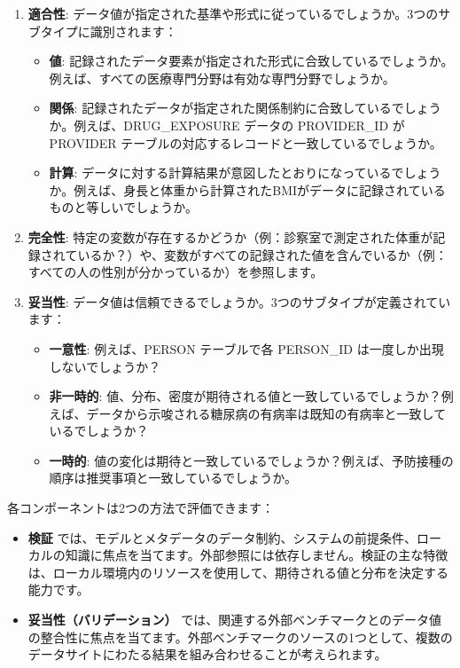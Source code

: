 \documentclass[
  11pt]{book}
\providecommand{\tightlist}{%
  \setlength{\itemsep}{0pt}\setlength{\parskip}{0pt}}
\theoremstyle{definition}
\theoremstyle{definition}
\theoremstyle{definition}
\theoremstyle{definition}
\theoremstyle{remark}
\begin{document}
\begin{enumerate}
\def\labelenumi{\arabic{enumi}.}
\item
  \textbf{適合性}: データ値が指定された基準や形式に従っているでしょうか。3つのサブタイプに識別されます：

  \begin{itemize}
  \tightlist
  \item
    \textbf{値}: 記録されたデータ要素が指定された形式に合致しているでしょうか。例えば、すべての医療専門分野は有効な専門分野でしょうか。
  \item
    \textbf{関係}: 記録されたデータが指定された関係制約に合致しているでしょうか。例えば、DRUG\_EXPOSURE データの PROVIDER\_ID が PROVIDER テーブルの対応するレコードと一致しているでしょうか。
  \item
    \textbf{計算}: データに対する計算結果が意図したとおりになっているでしょうか。例えば、身長と体重から計算されたBMIがデータに記録されているものと等しいでしょうか。
  \end{itemize}
\item
  \textbf{完全性}: 特定の変数が存在するかどうか（例：診察室で測定された体重が記録されているか？）や、変数がすべての記録された値を含んでいるか（例：すべての人の性別が分かっているか）を参照します。
\item
  \textbf{妥当性}: データ値は信頼できるでしょうか。3つのサブタイプが定義されています：

  \begin{itemize}
  \tightlist
  \item
    \textbf{一意性}: 例えば、PERSON テーブルで各 PERSON\_ID は一度しか出現しないでしょうか？
  \item
    \textbf{非一時的}: 値、分布、密度が期待される値と一致しているでしょうか？例えば、データから示唆される糖尿病の有病率は既知の有病率と一致しているでしょうか？
  \item
    \textbf{一時的}: 値の変化は期待と一致しているでしょうか？例えば、予防接種の順序は推奨事項と一致しているでしょうか。
  \end{itemize}

    
\end{enumerate}

各コンポーネントは2つの方法で評価できます：

\begin{itemize}
\tightlist
\item
  \textbf{検証} では、モデルとメタデータのデータ制約、システムの前提条件、ローカルの知識に焦点を当てます。外部参照には依存しません。検証の主な特徴は、ローカル環境内のリソースを使用して、期待される値と分布を決定する能力です。
\item
  \textbf{妥当性（バリデーション）} では、関連する外部ベンチマークとのデータ値の整合性に焦点を当てます。外部ベンチマークのソースの1つとして、複数のデータサイトにわたる結果を組み合わせることが考えられます。
\end{itemize}
\end{document}
